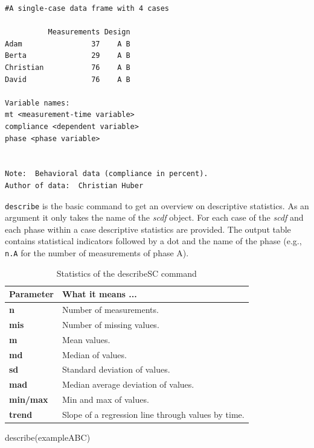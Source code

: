 \documentclass[
]{book}
\newenvironment{Shaded}{\begin{snugshade}}{\end{snugshade}}
\newcommand{\FunctionTok}[1]{\textcolor[rgb]{0.00,0.00,0.00}{#1}}
\newcommand{\NormalTok}[1]{#1}
\begin{document}
\begin{verbatim}
#A single-case data frame with 4 cases

          Measurements Design
Adam                37    A B
Berta               29    A B
Christian           76    A B
David               76    A B

Variable names:
mt <measurement-time variable>
compliance <dependent variable>
phase <phase variable>


Note:  Behavioral data (compliance in percent).
Author of data:  Christian Huber 
\end{verbatim}

\texttt{describe} is the basic command to get an overview on descriptive statistics. As an argument it only takes the name of the \emph{scdf} object. For each case of the \emph{scdf} and each phase within a case descriptive statistics are provided. The output table contains statistical indicators followed by a dot and the name of the phase (e.g., \texttt{n.A} for the number of measurements of phase A).

\begin{table}

\caption{\label{tab:table-describe}Statistics of the describeSC command}
\centering
\begin{tabular}[t]{>{\raggedright\arraybackslash}p{15em}>{\raggedright\arraybackslash}p{30em}}
\toprule
Parameter & What it means ...\\
\midrule
\textbf{n} & Number of measurements.\\
\textbf{mis} & Number of missing values.\\
\textbf{m} & Mean values.\\
\textbf{md} & Median of values.\\
\textbf{sd} & Standard deviation of values.\\
\addlinespace
\textbf{mad} & Median average deviation of values.\\
\textbf{min/max} & Min and max of values.\\
\textbf{trend} & Slope of a regression line through values by time.\\
\bottomrule
\end{tabular}
\end{table}

\begin{Shaded}
\begin{Highlighting}[]
\FunctionTok{describe}\NormalTok{(exampleABC)}
\end{Highlighting}
\end{Shaded}
\end{document}
